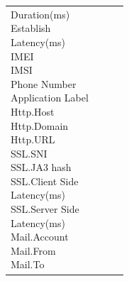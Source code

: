 \begin{description}
\begin{longtable}{p{}|p{}|p{}|p{}}
{                                                                                                    Duration(ms)\\
                                                                                                    Establish\\ Latency(ms)\\
                                                                                                    IMEI\\
                                                                                                    IMSI\\
                                                                                                    Phone Number\\
                                                                                                    Application Label\\
                                                                                                    Http.Host\\
                                                                                                    Http.Domain\\
                                                                                                    Http.URL\\
                                                                                                    SSL.SNI\\
                                                                                                    SSL.JA3 hash\\
                                                                                                    SSL.Client Side\\ Latency(ms)\\
                                                                                                    SSL.Server Side\\ Latency(ms)\\
                                                                                                    Mail.Account\\
                                                                                                    Mail.From\\
                                                                                                    Mail.To\\
}
\end{longtable}
\end{description}
